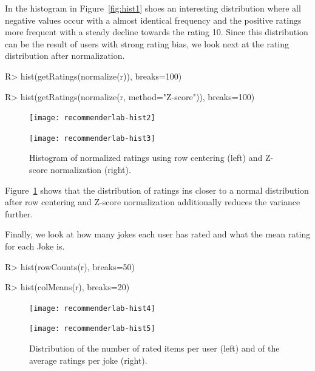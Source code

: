 \documentclass[nojss]{jss}
\begin{document}
In the histogram in Figure~\ref{fig:hist1}
shoes an interesting distribution
where all negative values occur with a almost identical frequency and
the positive ratings more frequent with a steady decline towards the
rating 10. Since this distribution can be the result of users with strong
rating bias, we look next at the rating distribution after normalization.

\begin{Schunk}
\begin{Sinput}
R> hist(getRatings(normalize(r)), breaks=100)
\end{Sinput}
\end{Schunk}
\begin{Schunk}
\begin{Sinput}
R> hist(getRatings(normalize(r, method="Z-score")), breaks=100)
\end{Sinput}
\end{Schunk}

\begin{figure}
\begin{minipage}[b]{.48\linewidth}
\centerline{\texttt{[image: recommenderlab-hist2]}}
\end{minipage}
\begin{minipage}[b]{.48\linewidth}
\centerline{\texttt{[image: recommenderlab-hist3]}}
\end{minipage}
\caption{Histogram of normalized ratings using row centering (left) and
Z-score normalization (right).}
\label{fig:hist2}
\end{figure}

Figure~\ref{fig:hist2} shows that the distribution of ratings
ins closer to a normal distribution after row centering and
Z-score normalization additionally reduces the variance further.

Finally, we look at how many jokes each user has rated and what the
mean rating for each Joke is.

\begin{Schunk}
\begin{Sinput}
R> hist(rowCounts(r), breaks=50)
\end{Sinput}
\end{Schunk}

\begin{Schunk}
\begin{Sinput}
R> hist(colMeans(r), breaks=20)
\end{Sinput}
\end{Schunk}

\begin{figure}
\begin{minipage}[b]{.48\linewidth}
\centerline{\texttt{[image: recommenderlab-hist4]}}
\end{minipage}
\begin{minipage}[b]{.48\linewidth}
\centerline{\texttt{[image: recommenderlab-hist5]}}
\end{minipage}
\caption{Distribution of the number of rated items per user (left) and
of the average ratings per joke (right).}
\label{fig:hist3}
\end{figure}
\end{document}
